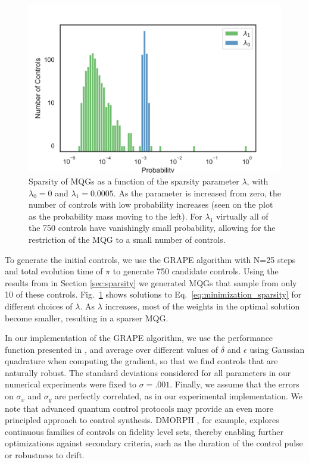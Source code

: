 \documentclass[aps,nofootinbib,pra,notitlepage,twocolumn]{revtex4-1}
\newcommand{\0}{\ensuremath{\mathbf{0}}}
\begin{document}
{\begin{figure}
\includegraphics[width=\columnwidth]{sparisity-versus-parameter_kcy.png}
\caption{Sparsity of MQGs as a function of the sparsity parameter $\lambda$, with $\lambda_0=0$ and $\lambda_1=0.0005$. As the parameter is increased from zero, the number of controls with low probability increases (seen on the plot as the probability mass moving to the left). For $\lambda_1$ virtually all of the 750 controls have vanishingly small probability, allowing for the restriction of the MQG to a small number of controls.}
\label{fig:sparsity}
\end{figure}
To generate the initial controls, we use the GRAPE algorithm\cite{Khaneja2005} with N=25 steps and total evolution time of $\pi$ to generate 750 candidate controls. Using the results from in Section \ref{sec:sparsity} we generated MQGs that sample from only 10 of these controls. Fig.~\ref{fig:sparsity} shows solutions to Eq.~\eqref{eq:minimization_sparsity} for different choices of  $\lambda$. As $\lambda$ increases, most of the weights in the optimal solution become smaller, resulting in a sparser MQG. 

In our implementation of the GRAPE algorithm, we use the performance function presented in \cite{Khaneja2005}, and average over different values of $\delta$ and $\epsilon$ using Gaussian quadrature when computing the gradient, so that we find controls that are naturally robust. The standard deviations considered for all parameters in our numerical experiments were fixed to $\sigma=.001$. Finally, we assume that the errors on $\sigma_x$ and $\sigma_y$ are perfectly correlated, as in our experimental implementation. We note that advanced quantum control protocols may provide an even more principled approach to control synthesis. DMORPH \cite{dominy2008exploring}, for example, explores continuous families of controls on fidelity level sets, thereby enabling further optimizations against secondary criteria, such as the duration of the control pulse or robustness to drift. 

}
\end{document}
